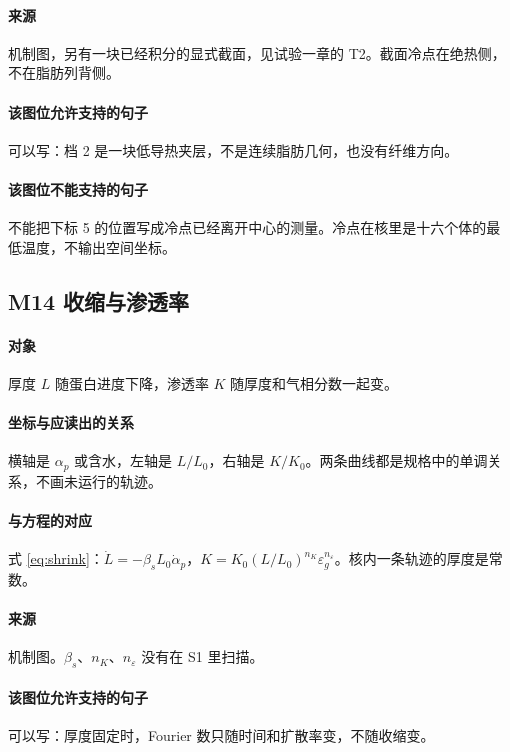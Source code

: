 \paragraph{来源}
机制图，另有一块已经积分的显式截面，见试验一章的 T2。截面冷点在绝热侧，不在脂肪列背侧。

\paragraph{该图位允许支持的句子}
可以写：档 2 是一块低导热夹层，不是连续脂肪几何，也没有纤维方向。

\paragraph{该图位不能支持的句子}
不能把下标 5 的位置写成冷点已经离开中心的测量。冷点在核里是十六个体的最低温度，不输出空间坐标。

\subsection{M14 收缩与渗透率}
\paragraph{对象}
厚度 $L$ 随蛋白进度下降，渗透率 $K$ 随厚度和气相分数一起变。

\paragraph{坐标与应读出的关系}
横轴是 $\alpha_p$ 或含水，左轴是 $L/L_0$，右轴是 $K/K_0$。两条曲线都是规格中的单调关系，不画未运行的轨迹。

\paragraph{与方程的对应}
式 \eqref{eq:shrink}：$\dot L=-\beta_s L_0\dot\alpha_p$，$K=K_0(L/L_0)^{n_K}\varepsilon_g^{n_\varepsilon}$。核内一条轨迹的厚度是常数。

\paragraph{来源}
机制图。$\beta_s$、$n_K$、$n_\varepsilon$ 没有在 S1 里扫描。

\paragraph{该图位允许支持的句子}
可以写：厚度固定时，Fourier 数只随时间和扩散率变，不随收缩变。

